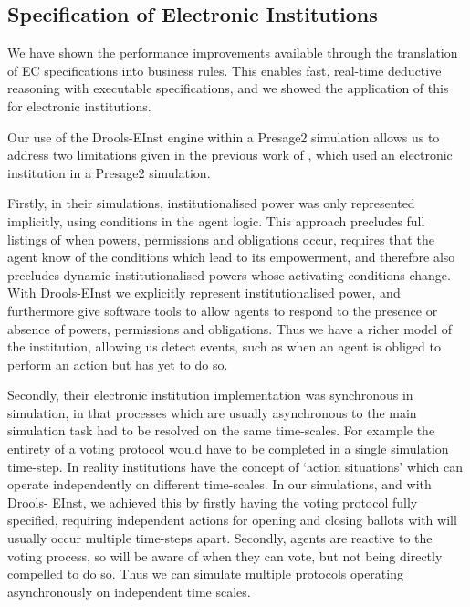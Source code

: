 \subsection{Specification of Electronic Institutions}

We have shown the performance improvements available through the translation
of \ac{EC} specifications into business rules. This enables fast, real-time
deductive reasoning with executable specifications, and we showed the
application of this for electronic institutions.

Our use of the Drools-EInst engine within a Presage2 simulation allows us to
address two limitations given in the previous work of \citet{Schaumeier2013},
which used an electronic institution in a Presage2 simulation.

Firstly, in their simulations, institutionalised power was only represented implicitly,
using conditions in the agent logic. This approach precludes full listings of when
powers, permissions and obligations occur, requires that the agent know of the
conditions which lead to its empowerment, and therefore also precludes dynamic
institutionalised powers whose activating conditions change. With Drools-EInst
we explicitly represent institutionalised power, and furthermore give software
tools to allow agents to respond to the presence or absence of powers,
permissions and obligations. Thus we have a richer model of the institution,
allowing us detect events, such as when an agent is obliged to perform an
action but has yet to do so.

Secondly, their electronic institution implementation was synchronous in
simulation, in that processes which are usually asynchronous to the main
simulation task had to be resolved on the same time-scales. For example the
entirety of a voting protocol would have to be completed in a single
simulation time-step. In reality institutions have the concept of `action
situations' which can operate independently on different time-scales. In our
simulations, and with Drools- EInst, we achieved this by firstly having the
voting protocol fully specified, requiring independent actions for opening and
closing ballots with will usually occur multiple time-steps apart. Secondly,
agents are reactive to the voting process, so will be aware of when they can
vote, but not being directly compelled to do so. Thus we can simulate multiple
protocols operating asynchronously on independent time scales.


